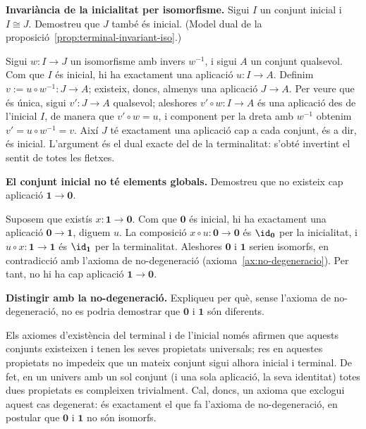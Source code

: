 \begin{exercici}
\textbf{Invariància de la inicialitat per isomorfisme.} Sigui \(I\) un conjunt inicial i \(I\cong J\). Demostreu que \(J\) també és inicial. (Model dual de la proposició~\ref{prop:terminal-invariant-iso}.)
\end{exercici}
\begin{solucio}
Sigui \(w\colon I\to J\) un isomorfisme amb invers \(w^{-1}\), i sigui \(A\) un conjunt qualsevol. Com que \(I\) és inicial, hi ha exactament una aplicació \(u\colon I\to A\). Definim \(v:=u\circ w^{-1}\colon J\to A\); existeix, doncs, almenys una aplicació \(J\to A\). Per veure que és única, sigui \(v'\colon J\to A\) qualsevol; aleshores \(v'\circ w\colon I\to A\) és una aplicació des de l'inicial \(I\), de manera que \(v'\circ w=u\), i component per la dreta amb \(w^{-1}\) obtenim \(v'=u\circ w^{-1}=v\). Així \(J\) té exactament una aplicació cap a cada conjunt, és a dir, és inicial. L'argument és el dual exacte del de la terminalitat: s'obté invertint el sentit de totes les fletxes.
\end{solucio}

\begin{exercici}
\textbf{El conjunt inicial no té elements globals.} Demostreu que no existeix cap aplicació \(\mathbf1\to\mathbf0\).
\end{exercici}
\begin{solucio}
Suposem que existís \(x\colon\mathbf1\to\mathbf0\). Com que \(\mathbf0\) és inicial, hi ha exactament una aplicació \(\mathbf0\to\mathbf1\), diguem \(u\). La composició \(x\circ u\colon\mathbf0\to\mathbf0\) és \(\id_{\mathbf0}\) per la inicialitat, i \(u\circ x\colon\mathbf1\to\mathbf1\) és \(\id_{\mathbf1}\) per la terminalitat. Aleshores \(\mathbf0\) i \(\mathbf1\) serien isomorfs, en contradicció amb l'axioma de no-degeneració (axioma~\ref{ax:no-degeneracio}). Per tant, no hi ha cap aplicació \(\mathbf1\to\mathbf0\).
\end{solucio}

\begin{exercici}
\textbf{Distingir amb la no-degeneració.} Expliqueu per què, sense l'axioma de no-degeneració, no es podria demostrar que \(\mathbf0\) i \(\mathbf1\) són diferents.
\end{exercici}
\begin{solucio}
Els axiomes d'existència del terminal i de l'inicial només afirmen que aquests conjunts existeixen i tenen les seves propietats universals; res en aquestes propietats no impedeix que un mateix conjunt sigui alhora inicial i terminal. De fet, en un univers amb un sol conjunt (i una sola aplicació, la seva identitat) totes dues propietats es compleixen trivialment. Cal, doncs, un axioma que exclogui aquest cas degenerat: és exactament el que fa l'axioma de no-degeneració, en postular que \(\mathbf0\) i \(\mathbf1\) no són isomorfs.
\end{solucio}

